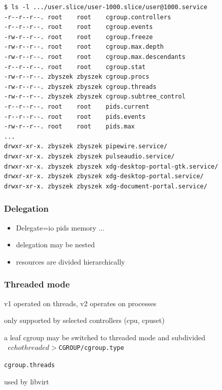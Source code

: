 \documentclass[serif]{beamer}
\begin{document}
\begin{frame}[fragile]
  \begin{verbatim}
$ ls -l .../user.slice/user-1000.slice/user@1000.service
-r--r--r--. root    root    cgroup.controllers
-r--r--r--. root    root    cgroup.events
-rw-r--r--. root    root    cgroup.freeze
-rw-r--r--. root    root    cgroup.max.depth
-rw-r--r--. root    root    cgroup.max.descendants
-r--r--r--. root    root    cgroup.stat
-rw-r--r--. zbyszek zbyszek cgroup.procs
-rw-r--r--. zbyszek zbyszek cgroup.threads
-rw-r--r--. zbyszek zbyszek cgroup.subtree_control
-r--r--r--. root    root    pids.current
-r--r--r--. root    root    pids.events
-rw-r--r--. root    root    pids.max
...
drwxr-xr-x. zbyszek zbyszek pipewire.service/
drwxr-xr-x. zbyszek zbyszek pulseaudio.service/
drwxr-xr-x. zbyszek zbyszek xdg-desktop-portal-gtk.service/
drwxr-xr-x. zbyszek zbyszek xdg-desktop-portal.service/
drwxr-xr-x. zbyszek zbyszek xdg-document-portal.service/
  \end{verbatim}
\end{frame}

\begin{frame}
  \frametitle{Delegation}
  
  \begin{itemize}
  \item Delegate=io pids memory ...
  \item delegation may be nested
  \item resources are divided hierarchically
  \end{itemize}
\end{frame}

\begin{frame}[fragile]
  \frametitle{Threaded mode}

  \pause
  
  v1 operated on threads, v2 operates on processes
  \medskip\pause

  only supported by selected controllers (cpu, cpuset)
  \medskip\pause

  a leaf cgroup may be switched to threaded mode and subdivided\\
  \texttt{        $ echo threaded > $CGROUP/cgroup.type}\\
  \pause

  \texttt{cgroup.threads}
  \medskip\pause

  used by libvirt
\end{frame}
\end{document}
